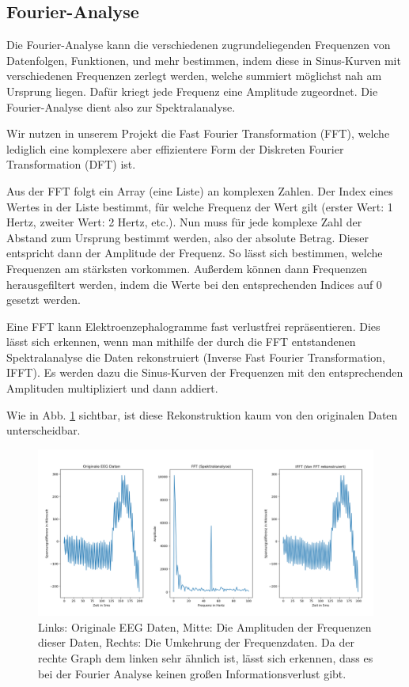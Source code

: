 \documentclass[10pt]{article}
\begin{document}
\subsection{Fourier-Analyse}

Die Fourier-Analyse kann die verschiedenen zugrundeliegenden Frequenzen von Datenfolgen, Funktionen, und mehr bestimmen, indem diese in Sinus-Kurven mit verschiedenen Frequenzen zerlegt werden, welche summiert möglichst nah am Ursprung liegen. 
Dafür kriegt jede Frequenz eine Amplitude zugeordnet.
Die Fourier-Analyse dient also zur Spektralanalyse.

Wir nutzen in unserem Projekt die Fast Fourier Transformation (FFT), welche lediglich eine komplexere aber effizientere Form der Diskreten Fourier Transformation (DFT) ist.

Aus der FFT folgt ein Array (eine Liste) an komplexen Zahlen. 
Der Index eines Wertes in der Liste bestimmt, für welche Frequenz der Wert gilt (erster Wert: 1 Hertz, zweiter Wert: 2 Hertz, etc.). Nun muss für jede komplexe Zahl der Abstand zum Ursprung bestimmt werden, also der absolute Betrag. 
Dieser entspricht dann der Amplitude der Frequenz. So lässt sich bestimmen, welche Frequenzen am stärksten vorkommen. Außerdem können dann Frequenzen herausgefiltert werden, indem die Werte bei den entsprechenden Indices auf 0 gesetzt werden. 

Eine FFT kann Elektroenzephalogramme fast verlustfrei repräsentieren. 
Dies lässt sich erkennen, wenn man mithilfe der durch die FFT entstandenen Spektralanalyse die Daten rekonstruiert (Inverse Fast Fourier Transformation, IFFT). 
Es werden dazu die Sinus-Kurven der Frequenzen mit den entsprechenden Amplituden multipliziert und dann addiert.

Wie in Abb. \ref{fig:ifft} sichtbar, ist diese Rekonstruktion kaum von den originalen Daten unterscheidbar. %

\begin{figure}[h!]
    \centering
    \includegraphics[width=\linewidth]{pictures/blink_fft_ifft.png}
    \caption{Links: Originale EEG Daten, Mitte: Die Amplituden der Frequenzen dieser Daten, Rechts: Die Umkehrung der Frequenzdaten. Da der rechte Graph dem linken sehr ähnlich ist, lässt sich erkennen, dass es bei der Fourier Analyse keinen großen Informationsverlust gibt.}
    \label{fig:ifft}
\end{figure}
\end{document}
